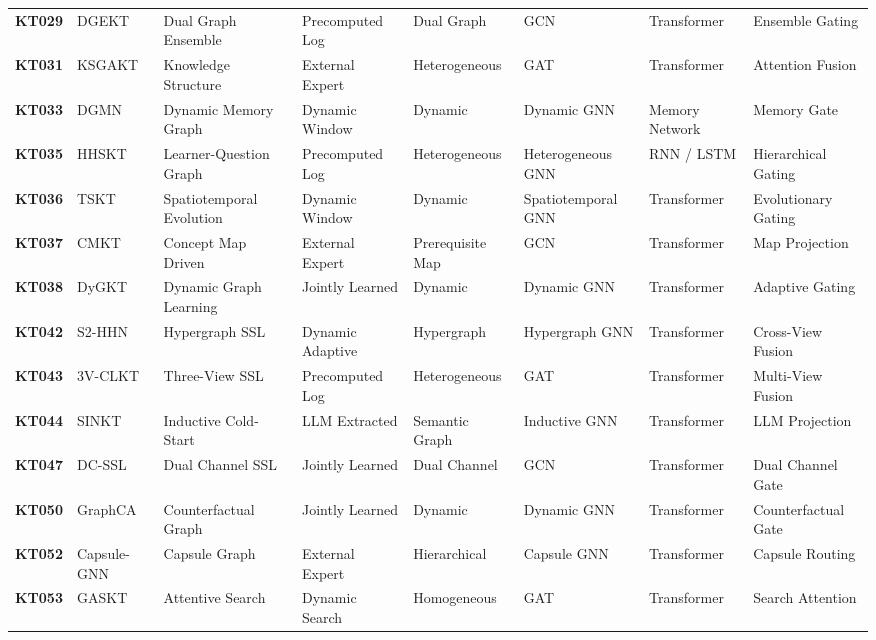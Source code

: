 \documentclass[journal]{IEEEtran}
\begin{document}
\begin{table}[t]
{\begin{tabular}{llllllll}
\textbf{KT029} & DGEKT \cite{KT029_DGEKT_2024} & Dual Graph Ensemble & Precomputed Log & Dual Graph & GCN & Transformer & Ensemble Gating \\
\textbf{KT031} & KSGAKT \cite{KT031_KSGAKT_2022} & Knowledge Structure & External Expert & Heterogeneous & GAT & Transformer & Attention Fusion \\
\textbf{KT033} & DGMN \cite{KT033_DGMN_2023} & Dynamic Memory Graph & Dynamic Window & Dynamic & Dynamic GNN & Memory Network & Memory Gate \\
\textbf{KT035} & HHSKT \cite{KT035_HHSKT_2023} & Learner-Question Graph & Precomputed Log & Heterogeneous & Heterogeneous GNN & RNN / LSTM & Hierarchical Gating \\
\textbf{KT036} & TSKT \cite{KT036_TSKT_2024} & Spatiotemporal Evolution & Dynamic Window & Dynamic & Spatiotemporal GNN & Transformer & Evolutionary Gating \\
\textbf{KT037} & CMKT \cite{KT037_CMKT_2022} & Concept Map Driven & External Expert & Prerequisite Map & GCN & Transformer & Map Projection \\
\textbf{KT038} & DyGKT \cite{KT038_DyGKT_2024} & Dynamic Graph Learning & Jointly Learned & Dynamic & Dynamic GNN & Transformer & Adaptive Gating \\
\textbf{KT042} & S2-HHN \cite{KT042_S2HHN_2023} & Hypergraph SSL & Dynamic Adaptive & Hypergraph & Hypergraph GNN & Transformer & Cross-View Fusion \\
\textbf{KT043} & 3V-CLKT \cite{KT043_3VCLKT_2024} & Three-View SSL & Precomputed Log & Heterogeneous & GAT & Transformer & Multi-View Fusion \\
\textbf{KT044} & SINKT \cite{KT044_SINKT_2024} & Inductive Cold-Start & LLM Extracted & Semantic Graph & Inductive GNN & Transformer & LLM Projection \\
\textbf{KT047} & DC-SSL \cite{KT047_DCSSL_2023} & Dual Channel SSL & Jointly Learned & Dual Channel & GCN & Transformer & Dual Channel Gate \\
\textbf{KT050} & GraphCA \cite{KT050_GraphCA_2023} & Counterfactual Graph & Jointly Learned & Dynamic & Dynamic GNN & Transformer & Counterfactual Gate \\
\textbf{KT052} & Capsule-GNN \cite{KT052_CapsuleGNN_2022} & Capsule Graph & External Expert & Hierarchical & Capsule GNN & Transformer & Capsule Routing \\
\textbf{KT053} & GASKT \cite{KT053_GASKT_2021} & Attentive Search & Dynamic Search & Homogeneous & GAT & Transformer & Search Attention \\

\end{tabular}}
\end{table}
\end{document}
